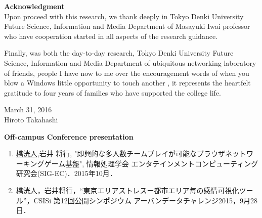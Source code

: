 \newpage
\pagestyle{plain}


\begin{flushleft}
{\huge{\bf Acknowledgment}}\\
\vspace{1cm}
Upon proceed with this research, we thank deeply in Tokyo Denki University Future Science, Information and Media Department of Masayuki Iwai professor who have cooperation started in all aspects of the research guidance.
\par
Finally, was both the day-to-day research, Tokyo Denki University Future Science, Information and Media Department of ubiquitous networking laboratory of friends, people I have now to me over the encouragement words of when you blow a Windows little opportunity to touch another , it represents the heartfelt gratitude to four years of families who have supported the college life.

\vspace{3cm}
\begin{flushright}
March 31, 2016\\
Hiroto Takahashi\\
\end{flushright}
\end{flushleft}



\newpage




\begin{flushleft}
{\huge{\bf Off-campus Conference presentation}}\\
\vspace{1cm}
\begin{enumerate}

\item \underline{橋洸人},岩井 将行, "即興的な多人数チームプレイが可能なブラウザネットワーキングゲーム基盤", 情報処理学会 エンタテインメントコンピューティング研究会(SIG-EC)．2015年10月．

\item \underline{橋洸人}，岩井将行，“東京エリアストレスー都市エリア毎の感情可視化ツール”，CSISi 第12回公開シンポジウム アーバンデータチャレンジ2015，9月28日．

\end{enumerate}
\end{flushleft}

